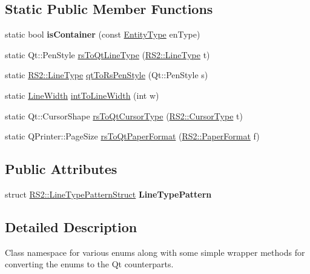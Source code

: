 \subsection*{Static Public Member Functions}
\begin{DoxyCompactItemize}
\item 
\hypertarget{classRS2_ac1fdca581db331a1b07ec68a2aaffa5c}{static bool {\bfseries is\-Container} (const \hyperlink{classRS2_a8f26d1b981e1e85cff16738b43337e6a}{Entity\-Type} en\-Type)}\label{classRS2_ac1fdca581db331a1b07ec68a2aaffa5c}

\item 
static Qt\-::\-Pen\-Style \hyperlink{classRS2_aaf709fca50d3cd5d38e41e3fcc115a68}{rs\-To\-Qt\-Line\-Type} (\hyperlink{classRS2_a6f3a82972c2d62456f6cacb74e14c95f}{R\-S2\-::\-Line\-Type} t)
\item 
static \hyperlink{classRS2_a6f3a82972c2d62456f6cacb74e14c95f}{R\-S2\-::\-Line\-Type} \hyperlink{classRS2_acad6e5163a16036556532c37750f7cac}{qt\-To\-Rs\-Pen\-Style} (Qt\-::\-Pen\-Style s)
\item 
static \hyperlink{classRS2_a023485c482c5ee9e36b3dfad781adf29}{Line\-Width} \hyperlink{classRS2_a3a2353d5f4b7f481eb54caed3fccb194}{int\-To\-Line\-Width} (int w)
\item 
static Qt\-::\-Cursor\-Shape \hyperlink{classRS2_ae4eb168bf7a7d6dd2e48f974c52e9095}{rs\-To\-Qt\-Cursor\-Type} (\hyperlink{classRS2_a15aa1c4c60c63de4dc688f0bcb43548d}{R\-S2\-::\-Cursor\-Type} t)
\item 
static Q\-Printer\-::\-Page\-Size \hyperlink{classRS2_a6eef8c61bd91a7821ad4aa683fbcad84}{rs\-To\-Qt\-Paper\-Format} (\hyperlink{classRS2_a99636ecac997160f1e2982859a043cb4}{R\-S2\-::\-Paper\-Format} f)
\end{DoxyCompactItemize}
\subsection*{Public Attributes}
\begin{DoxyCompactItemize}
\item 
\hypertarget{classRS2_aab26032e329a9bebf30462c6936ed608}{struct \hyperlink{structRS2_1_1LineTypePatternStruct}{R\-S2\-::\-Line\-Type\-Pattern\-Struct} {\bfseries Line\-Type\-Pattern}}\label{classRS2_aab26032e329a9bebf30462c6936ed608}

\end{DoxyCompactItemize}


\subsection{Detailed Description}
Class namespace for various enums along with some simple wrapper methods for converting the enums to the Qt counterparts.

